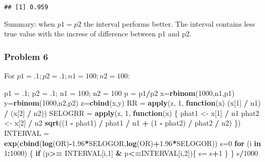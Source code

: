 \documentclass[]{article}
\newenvironment{Shaded}{\begin{snugshade}}{\end{snugshade}}
\newcommand{\KeywordTok}[1]{\textcolor[rgb]{0.13,0.29,0.53}{\textbf{#1}}}
\newcommand{\DecValTok}[1]{\textcolor[rgb]{0.00,0.00,0.81}{#1}}
\newcommand{\FloatTok}[1]{\textcolor[rgb]{0.00,0.00,0.81}{#1}}
\newcommand{\StringTok}[1]{\textcolor[rgb]{0.31,0.60,0.02}{#1}}
\newcommand{\ControlFlowTok}[1]{\textcolor[rgb]{0.13,0.29,0.53}{\textbf{#1}}}
\newcommand{\OperatorTok}[1]{\textcolor[rgb]{0.81,0.36,0.00}{\textbf{#1}}}
\newcommand{\NormalTok}[1]{#1}
\begin{document}
\begin{verbatim}
## [1] 0.959
\end{verbatim}

Summary: when \(p1 = p2\) the interval performs better. The interval
contains less true value with the increse of difference between p1 and
p2.

\subsubsection{Problem 6}\label{problem-6}

For \(p1 = .1; p2 = .1; n1 = 100; n2 = 100\):

\begin{Shaded}
\begin{Highlighting}[]
\NormalTok{p1 =}\StringTok{ }\NormalTok{.}\DecValTok{1}\NormalTok{; p2 =}\StringTok{ }\NormalTok{.}\DecValTok{1}\NormalTok{; n1 =}\StringTok{ }\DecValTok{100}\NormalTok{; n2 =}\StringTok{ }\DecValTok{100}
\NormalTok{p =}\StringTok{ }\NormalTok{p1}\OperatorTok{/}\NormalTok{p2}
\NormalTok{x=}\KeywordTok{rbinom}\NormalTok{(}\DecValTok{1000}\NormalTok{,n1,p1)}
\NormalTok{y=}\KeywordTok{rbinom}\NormalTok{(}\DecValTok{1000}\NormalTok{,n2,p2)}
\NormalTok{z=}\KeywordTok{cbind}\NormalTok{(x,y)}
\NormalTok{RR =}\StringTok{ }\KeywordTok{apply}\NormalTok{(z, }\DecValTok{1}\NormalTok{,}
\ControlFlowTok{function}\NormalTok{(x) (x[}\DecValTok{1}\NormalTok{] }\OperatorTok{/}\StringTok{ }\NormalTok{n1) }\OperatorTok{/}\StringTok{ }\NormalTok{(x[}\DecValTok{2}\NormalTok{] }\OperatorTok{/}\StringTok{ }\NormalTok{n2))}
\NormalTok{SELOGRR =}\StringTok{ }\KeywordTok{apply}\NormalTok{(z, }\DecValTok{1}\NormalTok{,}
\ControlFlowTok{function}\NormalTok{(x) \{}
\NormalTok{phat1 <-}\StringTok{ }\NormalTok{x[}\DecValTok{1}\NormalTok{] }\OperatorTok{/}\StringTok{ }\NormalTok{n1}
\NormalTok{phat2 <-}\StringTok{ }\NormalTok{x[}\DecValTok{2}\NormalTok{] }\OperatorTok{/}\StringTok{ }\NormalTok{n2}
\KeywordTok{sqrt}\NormalTok{((}\DecValTok{1} \OperatorTok{-}\StringTok{ }\NormalTok{phat1) }\OperatorTok{/}\StringTok{ }\NormalTok{phat1 }\OperatorTok{/}\StringTok{ }\NormalTok{n1 }\OperatorTok{+}\StringTok{ }\NormalTok{(}\DecValTok{1} \OperatorTok{-}\StringTok{ }\NormalTok{phat2) }\OperatorTok{/}\StringTok{ }\NormalTok{phat2 }\OperatorTok{/}\StringTok{ }\NormalTok{n2)}
\NormalTok{\})}
\NormalTok{INTERVAL =}\StringTok{ }\KeywordTok{exp}\NormalTok{(}\KeywordTok{cbind}\NormalTok{(}\KeywordTok{log}\NormalTok{(OR)}\OperatorTok{-}\FloatTok{1.96}\OperatorTok{*}\NormalTok{SELOGOR,}\KeywordTok{log}\NormalTok{(OR)}\OperatorTok{+}\FloatTok{1.96}\OperatorTok{*}\NormalTok{SELOGOR))}
\NormalTok{s=}\DecValTok{0}
\ControlFlowTok{for}\NormalTok{ (i }\ControlFlowTok{in} \DecValTok{1}\OperatorTok{:}\DecValTok{1000}\NormalTok{) \{}
  \ControlFlowTok{if}\NormalTok{ (p}\OperatorTok{>=}\StringTok{ }\NormalTok{INTERVAL[i,}\DecValTok{1}\NormalTok{] }\OperatorTok{&}\StringTok{ }\NormalTok{p}\OperatorTok{<=}\NormalTok{INTERVAL[i,}\DecValTok{2}\NormalTok{])\{}
\NormalTok{    s=}\StringTok{ }\NormalTok{s}\OperatorTok{+}\DecValTok{1}
\NormalTok{  \}}
\NormalTok{\}}
\NormalTok{s}\OperatorTok{/}\DecValTok{1000}
\end{Highlighting}
\end{Shaded}
\end{document}
